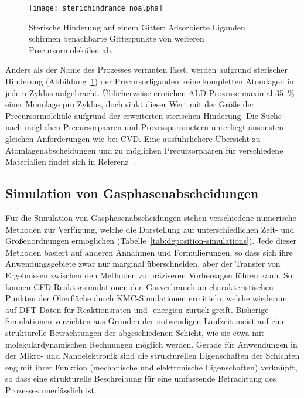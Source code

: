 \begin{figure}[b]
  \centering
  \texttt{[image: sterichindrance\_noalpha]}
  \caption[Sterische Hinderung auf einem Gitter]{
    Sterische Hinderung auf einem Gitter:
    Adsorbierte Liganden schirmen benachbarte Gitterpunkte von weiteren Precursormolekülen ab.
  }
  \label{fig:sterichindrance}
\end{figure}

Anders als der Name des Prozesses vermuten lässt, werden aufgrund sterischer Hinderung (Abbildung~\ref{fig:sterichindrance}) der Precursorliganden keine kompletten Atomlagen in jedem Zyklus aufgebracht.
Üblicherweise erreichen ALD-Prozesse maximal \SI{35}{\percent} einer Monolage pro Zyklus\cite{ylilammi_monolayer_1996}, doch sinkt dieser Wert mit der Größe der Precursormoleküle aufgrund der erweiterten sterischen Hinderung.
Die Suche nach möglichen Precursorpaaren und Prozessparametern unterliegt ansonsten gleichen Anforderungen wie bei CVD.
Eine ausführlichere Übersicht zu Atomlagenabscheidungen und zu möglichen Precursorpaaren für verschiedene Materialien findet sich in Referenz~\cite{puurunen_surface_2005}.

\subsection{Simulation von Gasphasenabscheidungen}

Für die Simulation von Gasphasenabscheidungen stehen verschiedene numerische Methoden zur Verfügung, welche die Darstellung auf unterschiedlichen Zeit- und Größenordnungen ermöglichen (Tabelle~\ref{tab:deposition-simulations}).
Jede dieser Methoden basiert auf anderen Annahmen und Formulierungen, so dass sich ihre Anwendungsgebiete zwar nur marginal überschneiden, aber der Transfer von Ergebnissen zwischen den Methoden zu präziseren Vorhersagen führen kann.
So können CFD-Reaktorsimulationen den Gasverbrauch an charakteristischen Punkten der Oberfläche durch KMC-Simulationen ermitteln, welche wiederum auf DFT-Daten für Reaktionsraten und -energien zurück greift.
Bisherige Simulationen verzichten aus Gründen der notwendigen Laufzeit meist auf eine strukturelle Betrachtungen der abgeschiedenen Schicht, wie sie etwa mit molekulardynamischen Rechnungen möglich werden.
Gerade für Anwendungen in der Mikro- und Nanoelektronik sind die strukturellen Eigenschaften der Schichten eng mit ihrer Funktion (mechanische und elektronische Eigenschaften) verknüpft, so dass eine strukturelle Beschreibung für eine umfassende Betrachtung des Prozesses unerlässlich ist.

